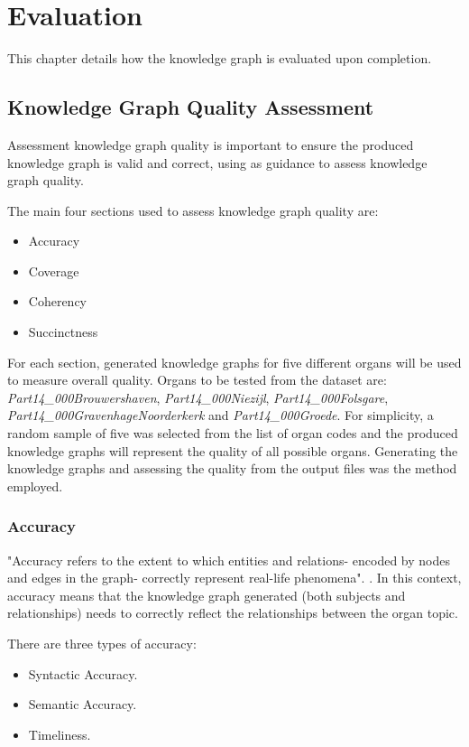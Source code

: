 \chapter{Evaluation}
This chapter details how the knowledge graph is evaluated upon completion. 

\section{Knowledge Graph Quality Assessment}
\hspace{0.5cm} Assessment knowledge graph quality is important to ensure the produced knowledge graph is valid and correct, using \cite{knowledgegraphevaulationbook} as guidance to assess knowledge graph quality.

The main four sections used to assess knowledge graph quality are: 

\begin{itemize}
    \itemsep0em 
    \item Accuracy
    \item Coverage
    \item Coherency
    \item Succinctness
\end{itemize}

For each section, generated knowledge graphs for five different organs will be used to measure overall quality. Organs to be tested from the dataset are: \textit{Part14\_000Brouwershaven}, \textit{Part14\_000Niezijl}, \textit{Part14\_000Folsgare}, \textit{Part14\_000GravenhageNoorderkerk} and \textit{Part14\_000Groede}. For simplicity, a random sample of five was selected from the list of organ codes and the produced knowledge graphs will represent the quality of all possible organs. Generating the knowledge graphs and assessing the quality from the output files was the method employed. 

\subsection{Accuracy}
\hspace{0.5cm} "Accuracy refers to the extent to which entities and relations- encoded by nodes and edges in the graph- correctly represent real-life phenomena". \cite{knowledgegraphevaulationbook}. In this context, accuracy means that the knowledge graph generated (both subjects and relationships) needs to correctly reflect the relationships between the organ topic. 

There are three types of accuracy: 
\begin{itemize}
    \itemsep0em 
\item Syntactic Accuracy.
\item Semantic Accuracy.
\item Timeliness.
\end{itemize}

